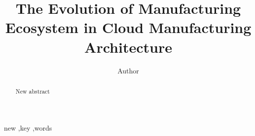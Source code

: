 
\title{The Evolution of Manufacturing Ecosystem in Cloud Manufacturing Architecture
}

\author[label1]{Author}
\address[label1]{ZJU}
\begin{abstract}
New abstract


\end{abstract}

\begin{keyword}
new \sep key \sep words
\end{keyword}